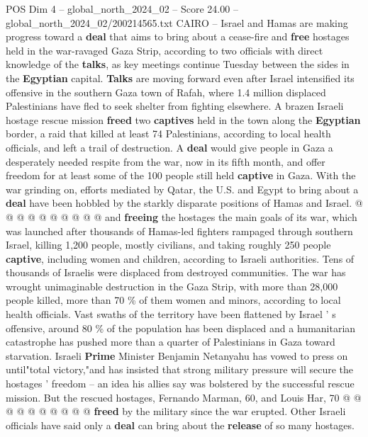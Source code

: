 \begin{textsample}{POS Dim 4 – global\_north\_2024\_02 – Score 24.00 – global\_north\_2024\_02/200214565.txt}  \label{ex:f4_pos_185}
CAIRO -- Israel and Hamas are making progress toward a \textbf{deal} that aims to bring about a cease-fire and \textbf{free} hostages held in the war-ravaged Gaza Strip, according to two officials with direct knowledge of the \textbf{talks}, as key meetings continue Tuesday between the sides in the \textbf{Egyptian} capital. \textbf{Talks} are moving forward even after Israel intensified its offensive in the southern Gaza town of Rafah, where 1.4 million displaced Palestinians have fled to seek shelter from fighting elsewhere.
A brazen Israeli hostage rescue mission \textbf{freed} two \textbf{captives} held in the town along the \textbf{Egyptian} border, a raid that killed at least 74 Palestinians, according to local health officials, and left a trail of destruction.
A \textbf{deal} would give people in Gaza a desperately needed respite from the war, now in its fifth month, and offer freedom for at least some of the 100 people still held \textbf{captive} in Gaza.
With the war grinding on, efforts mediated by Qatar, the U.S. and Egypt to bring about a \textbf{deal} have been hobbled by the starkly disparate positions of Hamas and Israel. @ @ @ @ @ @ @ @ @ @ and \textbf{freeing} the hostages the main goals of its war, which was launched after thousands of Hamas-led fighters rampaged through southern Israel, killing 1,200 people, mostly civilians, and taking roughly 250 people \textbf{captive}, including women and children, according to Israeli authorities.
Tens of thousands of Israelis were displaced from destroyed communities.
The war has wrought unimaginable destruction in the Gaza Strip, with more than 28,000 people killed, more than 70 \% of them women and minors, according to local health officials.
Vast swaths of the territory have been flattened by Israel ' s offensive, around 80 \% of the population has been displaced and a humanitarian catastrophe has pushed more than a quarter of Palestinians in Gaza toward starvation.
Israeli \textbf{Prime} Minister Benjamin Netanyahu has vowed to press on until"total victory,"and has insisted that strong military pressure will secure the hostages ' freedom -- an idea his allies say was bolstered by the successful rescue mission.
But the rescued hostages, Fernando Marman, 60, and Louis Har, 70 @ @ @ @ @ @ @ @ @ @ \textbf{freed} by the military since the war erupted.
Other Israeli officials have said only a \textbf{deal} can bring about the \textbf{release} of so many hostages.

\end{textsample}
